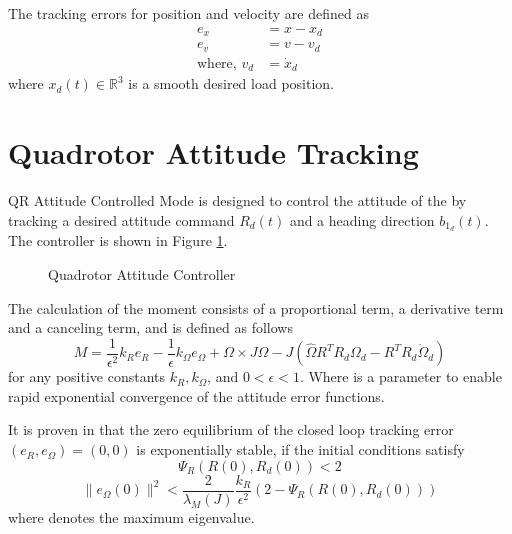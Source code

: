 The tracking errors for position and velocity are defined as
\begin{align}\label{key}
e_x&=x-x_d\\
e_v&=v-v_d\\
\text{where, }v_d&=\dot{x}_d
\end{align}
where $ x_d(t) \in \mathbb{R}^3$ is a smooth desired load position.

\section{Quadrotor Attitude Tracking}
QR Attitude Controlled Mode is designed to control the attitude of the  by tracking a desired  attitude command $ R_d(t) $ and a heading direction $ b_{1_d}(t) $. The controller is shown in Figure \ref{fig:con.qrattloop}.

\begin{figure}[h!]
	\centering
	\caption{Quadrotor Attitude Controller\label{fig:con.qrattloop}}
\end{figure}		

The calculation of the moment consists of a proportional term, a derivative term and a canceling term, and is defined as follows
\begin{equation}\label{eq:con.M}
M = \frac{1}{\epsilon^2}k_Re_R-\frac{1}{\epsilon}k_\Omega e_\Omega+\Omega\times J\Omega-J(\hat{\Omega}R^TR_d\Omega_d-R^TR_d\dot{\Omega}_d)
\end{equation}
for any positive constants $ k_R, k_\Omega $, and $ 0<\epsilon<1 $. Where  is a parameter to enable rapid exponential convergence of the attitude error functions.

It is proven in \cite{Lee2010} that the zero equilibrium of the closed loop tracking error $ (e_R,e_\Omega)=(0,0) $ is exponentially stable, if the initial conditions satisfy
\begin{equation}\label{eq:dom1}
\Psi_R(R(0),R_d(0))<2
\end{equation}
\begin{equation}\label{eq:dom2}
\parallel e_\Omega(0)\parallel^2<\frac{2}{\lambda_M(J)}\frac{k_R}{\epsilon^2}(2-\Psi_R(R(0),R_d(0)))
\end{equation}
where  denotes the maximum eigenvalue.

